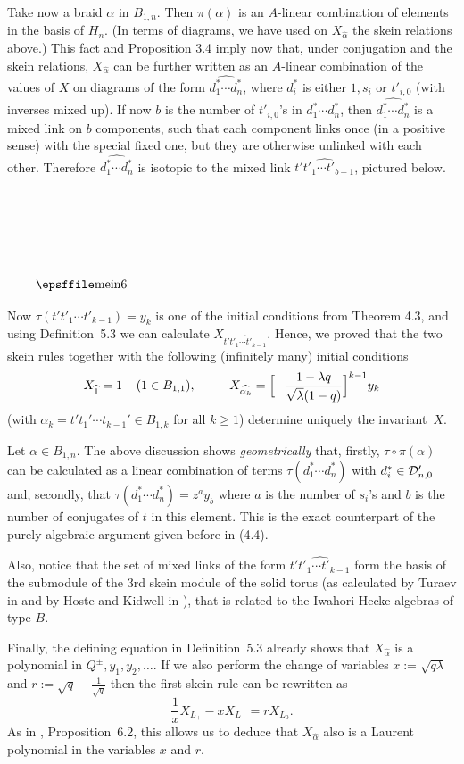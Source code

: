 Take   now  a braid $\alpha$  in  $B_{1,n}$.  Then $\pi(\alpha)$ is an
$A$-linear combination of elements in the basis of $H_n$. (In terms of
diagrams, we have used  on $X_{\widehat{\alpha}}$ the skein  relations
above.)  This   fact   and Proposition   3.4 imply   now   that, under
conjugation  and the skein   relations, $X_{\widehat{\alpha}}$  can be
further  written as an $A$-linear combination  of the values of $X$ on
diagrams of  the form    $\widehat{d_1^{*}  \cdots d_n^{*}}$,    where
$d_i^{*}$ is  either $1, s_i$ or  $t'_{i,0}$ (with inverses mixed up).
If now $b$ is the number of $t'_{i,0}$'s  in $d_1^{*} \cdots d_n^{*}$,
then $\widehat{d_1^{*} \cdots  d_n^{*}}$   is  a  mixed link  on   $b$
components, such that each component links once  (in a positive sense)
with the special fixed one, but they are  otherwise unlinked with each
other. Therefore $\widehat{d_1^{*} \cdots d_n^{*}}$ is isotopic to the
mixed link $\widehat{t' t'_1 \cdots t'_{b-1}}$, pictured below.

$$\vbox{\picill1.2inby1.1in(mein6)  }$$

\noindent Now $\tau(t't'_1 \cdots t'_{k-1})=y_{k}$ is one of the initial
conditions from Theorem 4.3, and using Definition~5.3 we can
calculate $X_{\widehat{t' t'_1  \cdots t'_{k-1}}}$. Hence, we proved that 
the two skein rules together with the following (infinitely  many) initial 
conditions \[ X_{\widehat{1}}=1 \;\;\;\;(1 \in B_{1,1}),\;\;\; \quad  
\;\;\; X_{\widehat{\alpha_k}}=\Bigl[-\frac{1-\lambda q}{\sqrt{\lambda}(1-q)}
\Bigr]^{k-1}y_k\] (with $\alpha_k=t't_1' \cdots t_{k-1}' \in B_{1,k}$ for 
all $k \geq 1$) determine uniquely the invariant~$X$.

\addtocounter{thm}{1}
\begin{rems}{\rm  
Let $\alpha \in B_{1,n}$. The above discussion shows {\em geometrically}
that, firstly,  $\tau \circ \pi(\alpha)$ can be calculated  as a linear 
combination of terms $\tau(d_1^{*} \cdots d_n^{*})$ with $d_i^{*} 
\in {\cal D}_{n,0}'$ and, secondly, that $\tau(d_1^{*} \cdots d_n^{*})=
z^ay_b$ where $a$ is the number of $s_i$'s and $b$ is the number of
conjugates of $t$ in this element. This is the exact counterpart of the 
purely algebraic argument given before in (4.4).

Also, notice that the set of mixed links of the form $\widehat{t' t'_1
\cdots t'_{k-1}}$ form the basis of the submodule  of the 3rd skein module
of the solid torus (as calculated by Turaev in \cite{T}  and by Hoste and  
Kidwell in \cite{HK}), that is related to the Iwahori-Hecke algebras of 
type $B$.

Finally, the defining equation in Definition~5.3 already shows    that
$X_{\widehat{\alpha}}$ is a polynomial in $Q^{\pm},y_1,y_2,\ldots$. If
we  also  perform the   change  of variables  $x:=\sqrt{q\lambda}$ and
$r:=\sqrt{q}-\frac{1}{\sqrt{q}}$  then the   first skein   rule can be
rewritten  as  \[\frac{1}{x}  X_{L_+}-x   X_{L_-}= rX_{L_0}.\]   As in
\cite{Jones}, Proposition~6.2,   this  allows   us  to   deduce   that
$X_{\widehat{\alpha}}$  also is a Laurent  polynomial in the variables
$x$ and $r$.} \end{rems}

